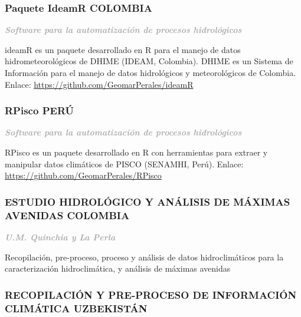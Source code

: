 \documentclass[
  10,
]{article}
\begin{document}
\hypertarget{paquete-ideamr-colombia}{%
\subsubsection{Paquete IdeamR \textbar{}
COLOMBIA}\label{paquete-ideamr-colombia}}

\textcolor{darkgray}{\textbf{\emph{Software para la automatización de procesos hidrológicos}}}

ideamR es un paquete desarrollado en R para el manejo de datos
hidrometeorológicos de DHIME (IDEAM, Colombia). DHIME es un Sistema de
Información para el manejo de datos hidrológicos y meteorológicos de
Colombia. Enlace: \url{https://github.com/GeomarPerales/ideamR}

\newpage

\hypertarget{rpisco-peruxfa}{%
\subsubsection{RPisco \textbar{} PERÚ}\label{rpisco-peruxfa}}

\textcolor{darkgray}{\textbf{\emph{Software para la automatización de procesos hidrológicos}}}

RPisco es un paquete desarrollado en R con herramientas para extraer y
manipular datos climáticos de PISCO (SENAMHI, Perú). Enlace:
\url{https://github.com/GeomarPerales/RPisco}

\hypertarget{estudio-hidroluxf3gico-y-anuxe1lisis-de-muxe1ximas-avenidas-colombia}{%
\subsubsection{ESTUDIO HIDROLÓGICO Y ANÁLISIS DE MÁXIMAS AVENIDAS
\textbar{}
COLOMBIA}\label{estudio-hidroluxf3gico-y-anuxe1lisis-de-muxe1ximas-avenidas-colombia}}

\textcolor{darkgray}{\textbf{\emph{U.M. Quinchia y La Perla}}}

Recopilación, pre-proceso, proceso y análisis de datos hidroclimáticos
para la caracterización hidroclimática, y análisis de máximas avenidas

\hypertarget{recopilaciuxf3n-y-pre-proceso-de-informaciuxf3n-climuxe1tica-uzbekistuxe1n}{%
\subsubsection{RECOPILACIÓN Y PRE-PROCESO DE INFORMACIÓN CLIMÁTICA
\textbar{}
UZBEKISTÁN}\label{recopilaciuxf3n-y-pre-proceso-de-informaciuxf3n-climuxe1tica-uzbekistuxe1n}}
\end{document}

